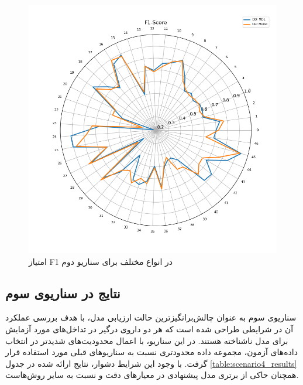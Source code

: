 \begin{figure}[t]
	\centering
	\includegraphics[width=\textwidth]{images/s3-f1-score.png}
	\caption{ امتیاز F1 در انواع مختلف برای سناریو دوم }
	\label{fig:s3_f1_score}
\end{figure}

\subsection{نتایج در سناریوی سوم}

سناریوی سوم به عنوان چالش‌برانگیزترین حالت ارزیابی مدل، با هدف بررسی عملکرد آن در شرایطی طراحی شده است که هر دو داروی درگیر در تداخل‌های مورد آزمایش برای مدل ناشناخته هستند. در این سناریو، با اعمال محدودیت‌های شدیدتر در انتخاب داده‌های آزمون، مجموعه داده محدودتری نسبت به سناریوهای قبلی مورد استفاده قرار گرفت. با وجود این شرایط دشوار، نتایج ارائه شده در جدول \ref{table:scenario4_results} همچنان حاکی از برتری مدل پیشنهادی در معیارهای دقت و  نسبت به سایر روش‌هاست.

